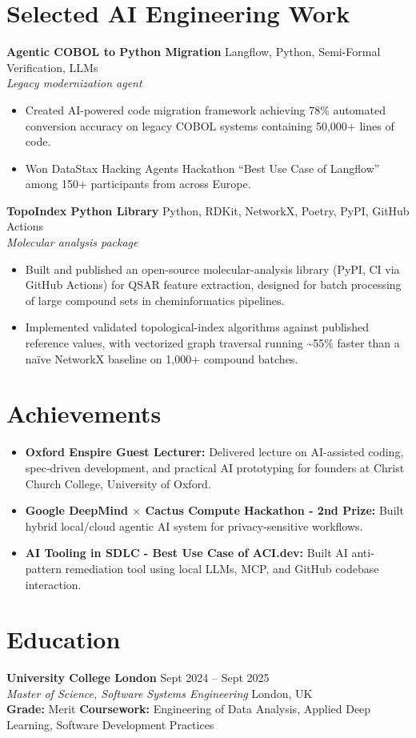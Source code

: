 \documentclass[10pt,letterpaper]{article}
\newcommand{\project}[3]{
  \vspace{2pt}
  {\bfseries\color{ink} #1} \hfill {\small\color{muted} #2}\\
  {\itshape\color{muted} #3}
}
\begin{document}
\section*{Selected AI Engineering Work}
\project{Agentic COBOL to Python Migration}{Langflow, Python, Semi-Formal Verification, LLMs}{Legacy modernization agent}
\begin{itemize}
  \item Created AI-powered code migration framework achieving 78\% automated conversion accuracy on legacy COBOL systems containing 50,000+ lines of code.
  \item Won DataStax Hacking Agents Hackathon ``Best Use Case of Langflow'' among 150+ participants from across Europe.
\end{itemize}

\project{TopoIndex Python Library}{Python, RDKit, NetworkX, Poetry, PyPI, GitHub Actions}{Molecular analysis package}
\begin{itemize}
  \item Built and published an open-source molecular-analysis library (PyPI, CI via GitHub Actions) for QSAR feature extraction, designed for batch processing of large compound sets in cheminformatics pipelines.
  \item Implemented validated topological-index algorithms against published reference values, with vectorized graph traversal running \textasciitilde55\% faster than a naïve NetworkX baseline on 1,000+ compound batches.
\end{itemize}

\section*{Achievements}
\begin{itemize}
  \item \textbf{Oxford Enspire Guest Lecturer:} Delivered lecture on AI-assisted coding, spec-driven development, and practical AI prototyping for founders at Christ Church College, University of Oxford.
  \item \textbf{Google DeepMind $\times$ Cactus Compute Hackathon - 2nd Prize:} Built hybrid local/cloud agentic AI system for privacy-sensitive workflows.
  \item \textbf{AI Tooling in SDLC - Best Use Case of ACI.dev:} Built AI anti-pattern remediation tool using local LLMs, MCP, and GitHub codebase interaction.
\end{itemize}

\section*{Education}
\textbf{University College London} \hfill Sept 2024 -- Sept 2025\\
\textit{Master of Science, Software Systems Engineering} \hfill London, UK\\
{\small\color{muted}\textbf{Grade:} Merit \textbar{} \textbf{Coursework:} Engineering of Data Analysis, Applied Deep Learning, Software Development Practices}
\end{document}
